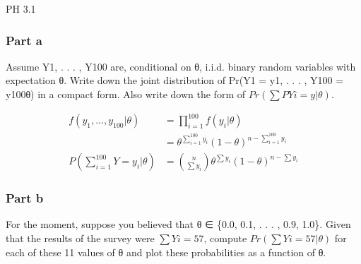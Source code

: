 \documentclass[
  letterpaper,
  DIV=11,
  numbers=noendperiod]{scrartcl}
\begin{document}
PH 3.1

\subsubsection{Part a}\label{part-a-2}

Assume Y1, . . . , Y100 are, conditional on θ, i.i.d. binary random
variables with expectation θ. Write down the joint distribution of Pr(Y1
= y1, . . . , Y100 = y100\textbar θ) in a compact form. Also write down
the form of \(Pr(\sum PYi = y|θ)\).

\begin{align*}
f(y_1, ..., y_{100}|\theta) &= \prod_{i=1}^{100}f(y_i|\theta)\\
&= \theta^{\sum_{i = 1}^{100}y_i}(1 - \theta)^{n - \sum_{i = 1}^{100}y_i}\\
P\left(\sum_{i = 1}^{100}Y = y_i|\theta\right) &= {n \choose \sum y_i} \theta^{\sum y_i}(1 - \theta)^{n - \sum y_i}
\end{align*}

\subsubsection{Part b}\label{part-b-2}

For the moment, suppose you believed that θ ∈ \{0.0, 0.1, . . . , 0.9,
1.0\}. Given that the results of the survey were \(\sum Yi = 57\),
compute \(Pr(\sum Yi = 57|θ)\) for each of these 11 values of θ and plot
these probabilities as a function of θ.
\end{document}
